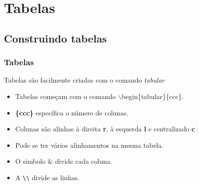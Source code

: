 \section{Tabelas}
\subsection{Construindo tabelas}


\begin{frame}[fragile]
  \frametitle{Tabelas}
   Tabelas são facilmente criadas com o comando \textit{tabular}

   \begin{itemize}
      \item Tabelas começam com o comando $\backslash$begin\{tabular\}\{ccc\}.
      \item \textbf{\{ccc\}} específica o número de colunas.
      \item Colunas são alinhas à direita \textbf{r}, à esquerda \textbf{l} e centralizado \textbf{c}
      \item Pode se ter vários alinhamentos na mesma tabela.
      \item O simbolo \& divide cada coluna.
      \item A \verb|\\| divide as linhas.
   \end{itemize}

\end{frame}


